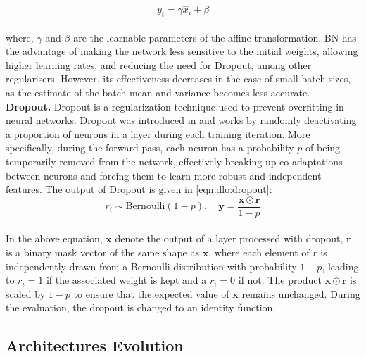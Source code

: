 \begin{equation}
  \label{eqn:dlo:batchnorm_affine}
  y_{i} = \gamma \hat{x}_{i} + \beta
\end{equation}\\

\noindent where, $\gamma$ and $\beta$ are the learnable parameters of the affine
transformation. \ac{BN} has the advantage of making the network less sensitive
to the initial weights, allowing higher learning rates, and reducing the need
for Dropout, among other regularisers. However, its effectiveness decreases in
the case of small batch sizes, as the estimate of the batch mean and variance
becomes less accurate.\\

\noindent \textbf{Dropout.} Dropout is a regularization technique used to
prevent overfitting in neural networks. Dropout was introduced in
\cite{DBLP:journals/jmlr/SrivastavaHKSS14} and works by randomly deactivating a
proportion of neurons in a layer during each training iteration. More
specifically, during the forward pass, each neuron has a probability $p$ of
being temporarily removed from the network, effectively breaking up
co-adaptations between neurons and forcing them to learn more robust and
independent features. The output of Dropout is given in \cref{eqn:dlo:dropout}:\\

\begin{equation}
  \label{eqn:dlo:dropout}
    r_i \sim \text{Bernoulli}(1 - p), \quad
    \mathbf{y} = \frac{\mathbf{x} \odot \mathbf{r}}{1 - p} 
\end{equation}\\

\noindent In the above equation, $\mathbf{x}$ denote the output of a layer
processed with dropout, $\mathbf{r}$ is a binary mask vector of the same shape
as $\mathbf{x}$, where each element of $r$ is independently drawn from a
Bernoulli distribution with probability $1-p$, leading to $r_i=1$ if the
associated weight is kept and a $r_i=0$ if not. The product $\mathbf{x} \odot
\mathbf{r}$ is scaled by $1-p$ to ensure that the expected value of $\mathbf{x}$
remains unchanged. During the evaluation, the dropout is changed to an identity
function.

\subsection{Architectures Evolution}\label{sec:dlo:architectures}

